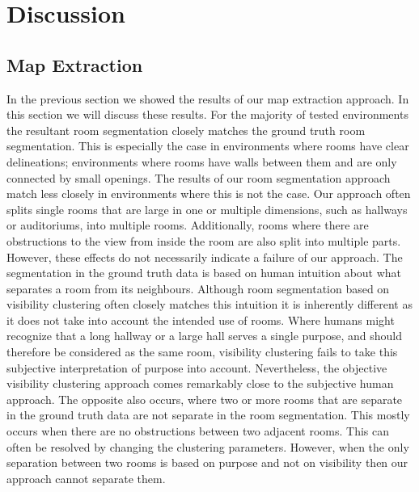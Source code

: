 \section{Discussion}

\subsection{Map Extraction}
In the previous section we showed the results of our map extraction approach. In this section we will discuss these results. For the majority of tested environments the resultant room segmentation closely matches the ground truth room segmentation. This is especially the case in environments where rooms have clear delineations; environments where rooms have walls between them and are only connected by small openings. The results of our room segmentation approach match less closely in environments where this is not the case. Our approach often splits single rooms that are large in one or multiple dimensions, such as hallways or auditoriums, into multiple rooms. Additionally, rooms where there are obstructions to the view from inside the room are also split into multiple parts. However, these effects do not necessarily indicate a failure of our approach. The segmentation in the ground truth data is based on human intuition about what separates a room from its neighbours. Although room segmentation based on visibility clustering often closely matches this intuition it is inherently different as it does not take into account the intended use of rooms. Where humans might recognize that a long hallway or a large hall serves a single purpose, and should therefore be considered as the same room, visibility clustering fails to take this subjective interpretation of purpose into account. Nevertheless, the objective visibility clustering approach comes remarkably close to the subjective human approach. The opposite also occurs, where two or more rooms that are separate in the ground truth data are not separate in the room segmentation. This mostly occurs when there are no obstructions between two adjacent rooms. This can often be resolved by changing the clustering parameters. However, when the only separation between two rooms is based on purpose and not on visibility then our approach cannot separate them.

